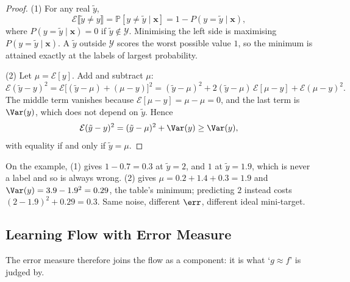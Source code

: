 \begin{proof}
    (1) For any real \(\tilde{y}\),
    \[
        \mathcal{E} \llbracket \tilde{y} \neq y \rrbracket
        = \mathbb{P}[y \neq \tilde{y} \mid \bm{x}]
        = 1 - P(y = \tilde{y} \mid \bm{x}) ,
    \]
    where \(P(y = \tilde{y} \mid \bm{x}) = 0\) if \(\tilde{y} \notin
    \mathcal{Y}\). Minimising the left side is maximising \(P(y = \tilde{y}
    \mid \bm{x})\). A \(\tilde{y}\) outside \(\mathcal{Y}\) scores the worst
    possible value \(1\), so the minimum is attained exactly at the labels of
    largest probability.

    (2) Let \(\mu = \mathcal{E}[y]\). Add and subtract \(\mu\):
    \[
        \mathcal{E} (\tilde{y} - y)^2
        = \mathcal{E} \bigl[ (\tilde{y} - \mu) + (\mu - y) \bigr]^2
        = (\tilde{y} - \mu)^2 + 2 (\tilde{y} - \mu)\, \mathcal{E}[\mu - y]
        + \mathcal{E} (\mu - y)^2 .
    \]
    The middle term vanishes because \(\mathcal{E}[\mu - y] = \mu - \mu = 0\),
    and the last term is \(\Var(y)\), which does not depend on \(\tilde{y}\).
    Hence
    \[
        \mathcal{E} (\tilde{y} - y)^2 = (\tilde{y} - \mu)^2 + \Var(y)
        \ge \Var(y) ,
    \]
    with equality if and only if \(\tilde{y} = \mu\).
\end{proof}

On the example, (1) gives \(1 - 0.7 = 0.3\) at \(\tilde{y} = 2\), and \(1\) at
\(\tilde{y} = 1.9\), which is never a label and so is always wrong. (2) gives
\(\mu = 0.2 + 1.4 + 0.3 = 1.9\) and \(\Var(y) = 3.9 - 1.9^2 = 0.29\), the
table's minimum; predicting \(2\) instead costs \((2 - 1.9)^2 + 0.29 = 0.3\).
Same noise, different \(\err\), different ideal mini-target.

\subsection{Learning Flow with Error Measure}

The error measure therefore joins the flow as a component: it is what `\(g
\approx f\)' is judged by.

